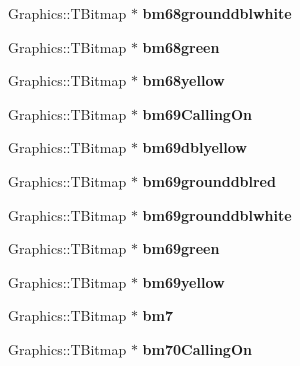 \begin{DoxyCompactItemize}
Graphics\+::\+T\+Bitmap $\ast$ {\bfseries bm68grounddblwhite}
\item 
\mbox{\label{class_t_rail_graphics_af757f0fb17fcb22d008b75b9b47d5a07}} 
Graphics\+::\+T\+Bitmap $\ast$ {\bfseries bm68green}
\item 
\mbox{\label{class_t_rail_graphics_ab29cefbaf9e37f9310b66aade818b61e}} 
Graphics\+::\+T\+Bitmap $\ast$ {\bfseries bm68yellow}
\item 
\mbox{\label{class_t_rail_graphics_a7a8e97317c7f206137ffbb9966402d59}} 
Graphics\+::\+T\+Bitmap $\ast$ {\bfseries bm69\+Calling\+On}
\item 
\mbox{\label{class_t_rail_graphics_a0e8ea4f17dfafb2a63c13079d6f41125}} 
Graphics\+::\+T\+Bitmap $\ast$ {\bfseries bm69dblyellow}
\item 
\mbox{\label{class_t_rail_graphics_a00e746faaf01affcf5c48b4a175595c1}} 
Graphics\+::\+T\+Bitmap $\ast$ {\bfseries bm69grounddblred}
\item 
\mbox{\label{class_t_rail_graphics_ae42f70241165e070cc0c5c1f25e79f62}} 
Graphics\+::\+T\+Bitmap $\ast$ {\bfseries bm69grounddblwhite}
\item 
\mbox{\label{class_t_rail_graphics_a741dfc55e5393fee99e8081439f0924e}} 
Graphics\+::\+T\+Bitmap $\ast$ {\bfseries bm69green}
\item 
\mbox{\label{class_t_rail_graphics_a9c14b504cc4dd019ba2584e1f907342a}} 
Graphics\+::\+T\+Bitmap $\ast$ {\bfseries bm69yellow}
\item 
\mbox{\label{class_t_rail_graphics_a04d292b5e22e78d59d5cd9e9888f4a82}} 
Graphics\+::\+T\+Bitmap $\ast$ {\bfseries bm7}
\item 
\mbox{\label{class_t_rail_graphics_a31e8e4756f64d4a1081901119c5a731e}} 
Graphics\+::\+T\+Bitmap $\ast$ {\bfseries bm70\+Calling\+On}
\item 
\mbox{\label{class_t_rail_graphics_aae0fd5ca244c65c3be4567c00485b76e}} 

\end{DoxyCompactItemize}
